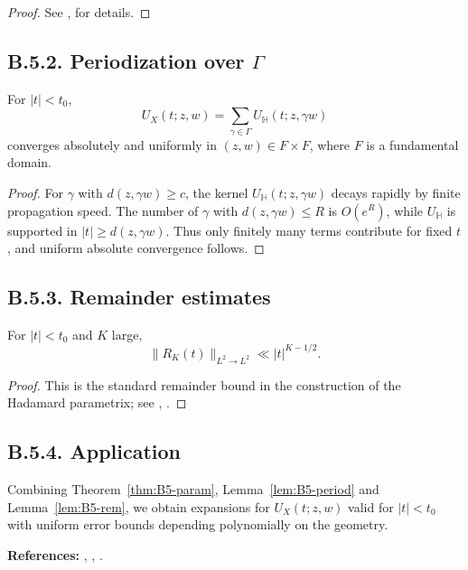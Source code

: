 \begin{proof}
See \cite[Ch.~5]{Sogge}, \cite[Ch.~11]{Zworski} for details.
\end{proof}

\subsection*{B.5.2. Periodization over $\Gamma$}

\begin{lemma}\label{lem:B5-period}
For $|t|<t_0$,
\[
U_X(t;z,w)=\sum_{\gamma\in\Gamma}U_{\mathbb{H}}(t;z,\gamma w)
\]
converges absolutely and uniformly in $(z,w)\in F\times F$, where $F$ is a fundamental domain.
\end{lemma}

\begin{proof}
For $\gamma$ with $d(z,\gamma w)\ge c$, the kernel $U_{\mathbb{H}}(t;z,\gamma w)$ decays rapidly by finite propagation speed.
The number of $\gamma$ with $d(z,\gamma w)\le R$ is $O(e^R)$, while $U_{\mathbb{H}}$ is supported in $|t|\ge d(z,\gamma w)$.
Thus only finitely many terms contribute for fixed $t$, and uniform absolute convergence follows.
\end{proof}

\subsection*{B.5.3. Remainder estimates}

\begin{lemma}\label{lem:B5-rem}
For $|t|<t_0$ and $K$ large,
\[
\|R_K(t)\|_{L^2\to L^2}\ll |t|^{K-1/2}.
\]
\end{lemma}

\begin{proof}
This is the standard remainder bound in the construction of the Hadamard parametrix; see \cite{Sogge}, \cite{Zworski}.
\end{proof}

\subsection*{B.5.4. Application}

Combining Theorem~\ref{thm:B5-param}, Lemma~\ref{lem:B5-period} and Lemma~\ref{lem:B5-rem}, we obtain expansions for $U_X(t;z,w)$ valid for $|t|<t_0$ with uniform error bounds depending polynomially on the geometry.

\medskip
\noindent\textbf{References:} \cite{Sogge}, \cite{Zworski}, \cite{HejhalI}.

